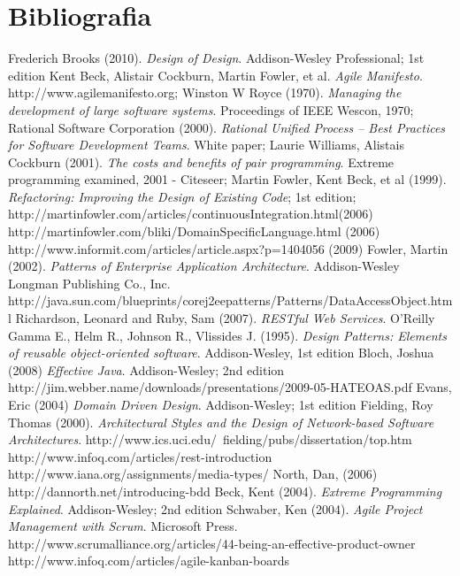 \section{Bibliografia}

\begin{thebibliography}{30} 

 Frederich Brooks (2010). \textit{Design of Design}. Addison-Wesley Professional; 1st edition
 Kent Beck, Alistair Cockburn, Martin Fowler, et al. \textit{Agile Manifesto}. http://www.agilemanifesto.org;
 Winston W Royce (1970). \textit{Managing the development of large software systems}.
Proceedings of IEEE Wescon, 1970;
 Rational Software Corporation (2000). \textit{Rational Unified Process -- Best Practices for Software Development Teams}. White paper;
 Laurie Williams, Alistais Cockburn (2001). \textit{The costs and benefits of pair programming}. Extreme programming examined, 2001 - Citeseer;
 Martin Fowler, Kent Beck, et al (1999). \textit{Refactoring: Improving the Design of Existing Code}; 1st edition;
 http://martinfowler.com/articles/continuousIntegration.html(2006)
 http://martinfowler.com/bliki/DomainSpecificLanguage.html (2006)
 http://www.informit.com/articles/article.aspx?p=1404056 (2009)
 Fowler, Martin (2002). \textit{Patterns of Enterprise Application Architecture}.  Addison-Wesley Longman Publishing Co., Inc.
 http://java.sun.com/blueprints/corej2eepatterns/Patterns/DataAccessObject.html
 Richardson, Leonard and Ruby, Sam (2007). \textit{RESTful Web Services}. O'Reilly
 Gamma E., Helm R., Johnson R., Vlissides J. (1995). \textit{Design Patterns: Elements of reusable object-oriented software}. Addison-Wesley, 1st edition
 Bloch, Joshua (2008) \textit{Effective Java}. Addison-Wesley; 2nd edition
 http://jim.webber.name/downloads/presentations/2009-05-HATEOAS.pdf
 Evans, Eric (2004) \textit{Domain Driven Design}. Addison-Wesley; 1st edition 
 Fielding, Roy Thomas (2000). \textit{Architectural Styles and the Design of Network-based Software Architectures}. http://www.ics.uci.edu/~fielding/pubs/dissertation/top.htm
 http://www.infoq.com/articles/rest-introduction
 http://www.iana.org/assignments/media-types/
 North, Dan, (2006) http://dannorth.net/introducing-bdd
 Beck, Kent (2004). \textit{Extreme Programming Explained}. Addison-Wesley; 2nd edition
 Schwaber, Ken (2004). \textit{Agile Project Management with Scrum}. Microsoft Press.
 http://www.scrumalliance.org/articles/44-being-an-effective-product-owner
 http://www.infoq.com/articles/agile-kanban-boards

\end{thebibliography}
